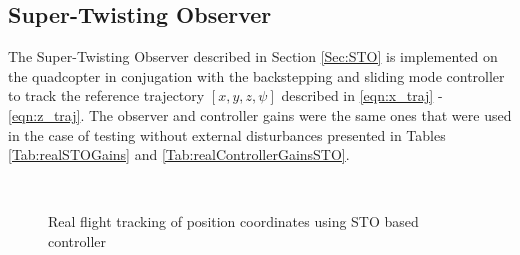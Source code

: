 \documentclass[letterpaper%
, twoside%
, 12pt%
,memoire%
, english%
,creativecommons,hyperref%
]{thETS}
\begin{document}
\subsection{Super-Twisting Observer}
The Super-Twisting Observer described in Section \ref{Sec:STO} is implemented on the quadcopter in conjugation with the backstepping and sliding mode controller to track the reference trajectory $[x,y,z,\psi]$ described in \eqref{eqn:x_traj} - \eqref{eqn:z_traj}. The observer and controller gains were the same ones that were used in the case of testing without external disturbances presented in Tables \ref{Tab:realSTOGains} and \ref{Tab:realControllerGainsSTO}. 

\begin{figure}[H]
	\centering
	 \\ \parbox{0.75\textwidth}{\caption{Real flight tracking of position coordinates using STO based controller\label{Fig:xyztracSTODist}}}
\end{figure}
\end{document}
